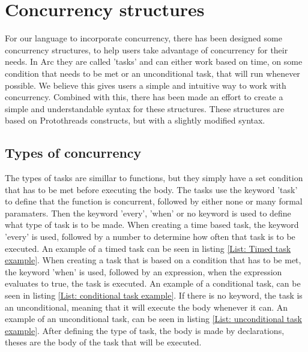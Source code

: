 
\section{Concurrency structures}
For our language to incorporate concurrency, there has been designed some concurrency structures, to help users take advantage of concurrency for their needs. In Arc they are called 'tasks' and can either work based on time, on some condition that needs to be met or an unconditional task, that will run whenever possible. We believe this gives users a simple and intuitive way to work with concurrency. Combined with this, there has been made an effort to create a simple and understandable syntax for these structures. These structures are based on Protothreads constructs, but with a slightly modified syntax. 

\subsection{Types of concurrency}
The types of tasks are simillar to functions, but they simply have a set condition that has to be met before executing the body. The tasks use the keyword 'task' to define that the function is concurrent, followed by either none or many formal paramaters. Then the keyword 'every', 'when' or no keyword is used to define what type of task is to be made. When creating a time based task, the keyword 'every' is used, followed by a number to determine how often that task is to be executed. An example of a timed task can be seen in listing \ref*{List: Timed task example}. When creating a task that is based on a condition that has to be met, the keyword 'when' is used, followed by an expression, when the expression evaluates to true, the task is executed. An example of a conditional task, can be seen in listing \ref*{List: conditional task example}. If there is no keyword, the task is an unconditional, meaning that it will execute the body whenever it can. An example of an unconditional task, can be seen in listing \ref*{List: unconditional task example}. After defining the type of task, the body is made by declarations, theses are the body of the task that will be executed.

